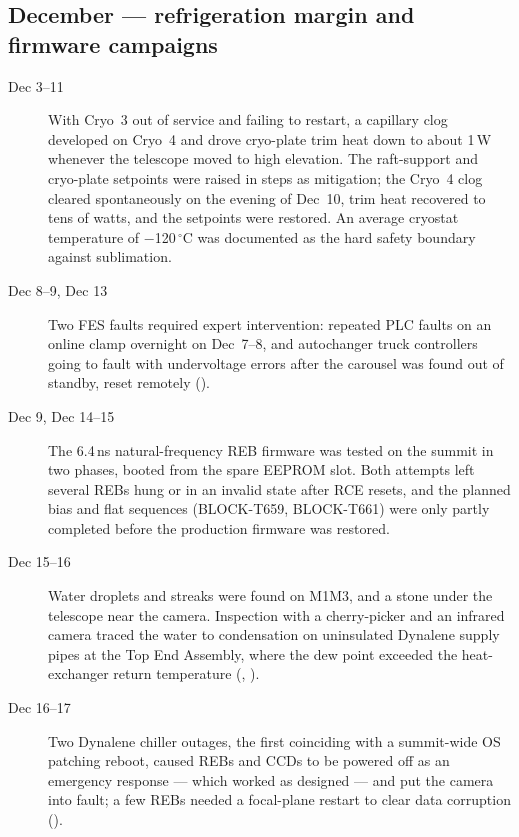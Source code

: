 \subsection{December --- refrigeration margin and firmware campaigns}
\begin{description}
\item[Dec 3--11] With Cryo~3 out of service and failing to restart, a
  capillary clog developed on Cryo~4 and drove cryo-plate trim heat
  down to about 1\,W whenever the telescope moved to high elevation.
  The raft-support and cryo-plate setpoints were raised in steps as
  mitigation; the Cryo~4 clog cleared spontaneously on the evening of
  Dec~10, trim heat recovered to tens of watts, and the setpoints were
  restored.  An average cryostat temperature of $-$120\,$^{\circ}$C was
  documented as the hard safety boundary against sublimation.

\item[Dec 8--9, Dec 13] Two FES faults required expert intervention:
  repeated PLC faults on an online clamp overnight on Dec~7--8, and
  autochanger truck controllers going to fault with undervoltage
  errors after the carousel was found out of standby, reset remotely
  ().

\item[Dec 9, Dec 14--15] The 6.4\,ns natural-frequency REB firmware was
  tested on the summit in two phases, booted from the spare EEPROM
  slot.  Both attempts left several REBs hung or in an invalid state
  after RCE resets, and the planned bias and flat sequences
  (BLOCK-T659, BLOCK-T661) were only partly completed before the
  production firmware was restored.

\item[Dec 15--16] Water droplets and streaks were found on M1M3, and a
  stone under the telescope near the camera.  Inspection with a
  cherry-picker and an infrared camera traced the water to condensation
  on uninsulated Dynalene supply pipes at the Top End Assembly, where
  the dew point exceeded the heat-exchanger return temperature (,
  ).

\item[Dec 16--17] Two Dynalene chiller outages, the first coinciding
  with a summit-wide OS patching reboot, caused REBs and CCDs to be
  powered off as an emergency response --- which worked as designed ---
  and put the camera into fault; a few REBs needed a focal-plane
  restart to clear data corruption ().


\end{description}

